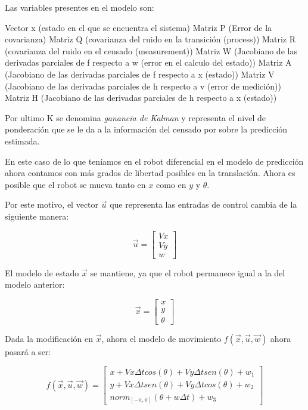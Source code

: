 
Las variables presentes en el modelo son: 

Vector x (estado en el que se encuentra el sistema)
Matriz P (Error de la covarianza)
Matriz Q (covarianza del ruido en la transición (process))
Matriz R (covarianza del ruido en el censado (measurement))
Matriz W (Jacobiano de las derivadas parciales de f respecto a w (error en el calculo del estado))
Matriz A (Jacobiano de las derivadas parciales de f respecto a x (estado))
Matriz V (Jacobiano de las derivadas parciales de h respecto a v (error de medición))
Matriz H (Jacobiano de las derivadas parciales de h respecto a x (estado))
 
Por ultimo K se denomina \textit{ganancia de Kalman} y representa el nivel de ponderación que se le da a la información del censado por sobre la predicción estimada.

En este caso de lo que teníamos en el robot diferencial en el modelo de predicción ahora contamos con más grados de libertad posibles en la translación. Ahora es posible que el robot se mueva tanto en $x$ como en $y$ y $\theta$.

Por este motivo, el vector $\overrightarrow{u}$ que representa las entradas de control cambia de la siguiente manera:

$$\overrightarrow{u} = \begin{bmatrix}
         Vx \\
         Vy \\
         w 
        \end{bmatrix}$$


El modelo de estado $\overrightarrow{x}$ se mantiene, ya que el robot permanece igual a la del modelo anterior:

$$\overrightarrow{x} = \begin{bmatrix}
         x \\
         y \\
         \theta 
        \end{bmatrix}$$

Dada la modificación en $\overrightarrow{x}$, ahora el modelo de movimiento $f(\overrightarrow{x},\overrightarrow{u}, \overrightarrow{w})$ ahora pasará a ser:

$$f(\overrightarrow{x},\overrightarrow{u}, \overrightarrow{w})= \begin{bmatrix}
         x + Vx \Delta t cos(\theta) + Vy \Delta t sen(\theta) + w_1 \\
         y + Vx \Delta t sen(\theta) + Vy \Delta t cos(\theta) + w_2 \\
         norm_{[-\pi,\pi]} (\theta + w \Delta t) + w_3
         \end{bmatrix}$$

